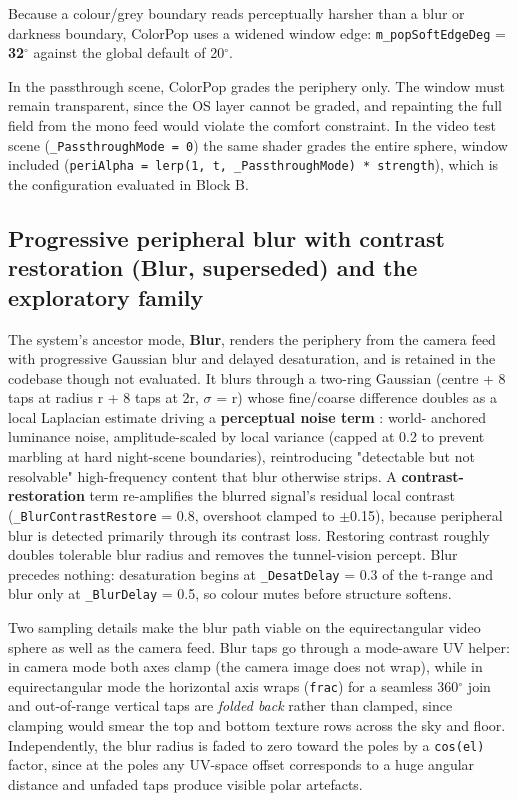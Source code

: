 Because a colour/grey boundary reads perceptually harsher than a blur or darkness boundary, ColorPop
uses a widened window edge: \verb|m_popSoftEdgeDeg| = \textbf{32$^{\circ}$} against the global default of 20$^{\circ}$.

In the passthrough scene, ColorPop grades the periphery only. The window must remain transparent,
since the OS layer cannot be graded, and repainting the full field from the mono feed would violate
the comfort constraint. In the video test scene (\verb|_PassthroughMode = 0|) the same shader grades the
entire sphere, window included (\verb|periAlpha = lerp(1, t, _PassthroughMode) * strength|), which is the
configuration evaluated in Block B.


\subsection{Progressive peripheral blur with contrast restoration (Blur, superseded) and the exploratory family}

The system's ancestor mode, \textbf{Blur}, renders the periphery from the camera feed with progressive
Gaussian blur and delayed desaturation, and is retained in the codebase though not evaluated. It
blurs through a two-ring Gaussian
(centre + 8 taps at radius r + 8 taps at 2r, $\sigma$ = r) whose fine/coarse difference doubles as a local
Laplacian estimate driving a \textbf{perceptual noise term} \citep{tariq2022}: world-
anchored luminance noise, amplitude-scaled by local variance (capped at 0.2 to prevent marbling at
hard night-scene boundaries), reintroducing "detectable but not resolvable" high-frequency content
that blur otherwise strips. A \textbf{contrast-restoration} term \citep{patney2016} re-amplifies
the blurred signal's residual local contrast (\verb|_BlurContrastRestore| = 0.8, overshoot clamped to
$\pm$0.15), because peripheral blur is detected primarily through its contrast loss. Restoring contrast
roughly doubles tolerable blur radius and removes the tunnel-vision percept. Blur precedes nothing:
desaturation begins at \verb|_DesatDelay| = 0.3 of the t-range and blur only at \verb|_BlurDelay| = 0.5, so
colour mutes before structure softens.

Two sampling details make the blur path viable on the equirectangular video sphere as well as the
camera feed. Blur taps go through a mode-aware UV helper: in camera mode both axes clamp (the camera
image does not wrap), while in equirectangular mode the horizontal axis wraps (\verb|frac|) for a seamless
360$^{\circ}$ join and out-of-range vertical taps are \textit{folded back} rather than clamped, since clamping
would smear the top and bottom texture rows across the sky and floor. Independently, the blur radius
is faded to zero toward the poles by a \verb|cos(el)| factor, since at the poles any UV-space offset
corresponds to a huge angular distance and unfaded taps produce visible polar artefacts.

